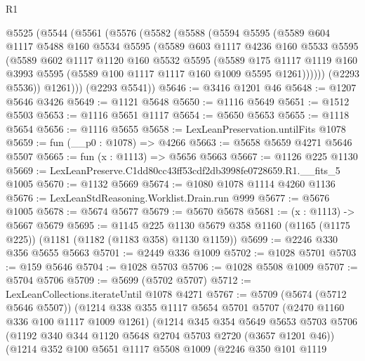 \begin{lexlean}{R1}
\begin{coremodule}
  @5525
    (@5544
      (@5561
        (@5576
          (@5582
            (@5588
              (@5594
                @5595
                (@5589
                  @604
                  @1117
                  @5488
                  @160
                  @5534
                  @5595
                  (@5589
                    @603
                    @1117
                    @4236
                    @160
                    @5533
                    @5595
                    (@5589
                      @602
                      @1117
                      @1120
                      @160
                      @5532
                      @5595
                      (@5589
                        @175
                        @1117
                        @1119
                        @160
                        @3993
                        @5595
                        (@5589 @100 @1117 @1117 @160 @1009 @5595 @1261))))))
              (@2293 @5536))
            @1261)))
      (@2293 @5541))
@5646 := @3416 @1201 @46
@5648 := @1207 @5646 @3426
@5649 := @1121 @5648
@5650 := @1116 @5649
@5651 := @1512 @5503
@5653 := @1116 @5651 @1117
@5654 := @5650 @5653
@5655 := @1118 @5654
@5656 := @1116 @5655
@5658 := LexLeanPreservation.untilFits @1078
@5659 := fun (__p0 : @1078) => @4266
@5663 := @5658 @5659 @4271 @5646 @5507
@5665 := fun (x : @1113) => @5656 @5663
@5667 := @1126 @225 @1130
@5669 := LexLeanPreserve.C1dd80cc43ff53cdf2db3998fe0728659.R1.__fits_5 @1005
@5670 := @1132 @5669
@5674 := @1080 @1078 @1114 @4260 @1136
@5676 := LexLeanStdReasoning.Worklist.Drain.run @999
@5677 := @5676 @1005
@5678 := @5674 @5677
@5679 := @5670 @5678
@5681 := (x : @1113) -> @5667 @5679
@5695 := @1145
    @225
    @1130
    @5679
    @358
    @1160
    (@1165 (@1175 @225))
    (@1181 (@1182 (@1183 @358) @1130 @1159))
@5699 := @2246 @330 @356 @5655 @5663
@5701 := @2449 @336 @1009
@5702 := @1028 @5701
@5703 := @159 @5646
@5704 := @1028 @5703
@5706 := @1028 @5508 @1009
@5707 := @5704 @5706
@5709 := @5699 (@5702 @5707)
@5712 := LexLeanCollections.iterateUntil @1078 @4271
@5767 := @5709
    (@5674 (@5712 @5646 @5507))
    (@1214
      @338
      @355
      @1117
      @5654
      @5701
      @5707
      (@2470 @1160 @336 @100 @1117 @1009 @1261)
      (@1214
        @345
        @354
        @5649
        @5653
        @5703
        @5706
        (@1192 @340 @344 @1120 @5648 @2704 @5703 @2720 (@3657 @1201 @46))
        (@1214
          @352
          @100
          @5651
          @1117
          @5508
          @1009
          (@2246
            @350
            @101
            @1119

\end{coremodule}
\end{lexlean}

